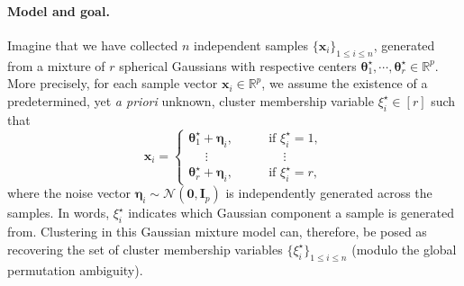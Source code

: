 \paragraph{Model and goal.}
Imagine that we have collected $n$ independent samples $\{\bm{x}_{i}\}_{1\leq i\leq n}$,
generated from a mixture of $r$ spherical Gaussians with respective centers $\bm{\theta}_{1}^{\star},\cdots,\bm{\theta}_{r}^{\star}\in\mathbb{R}^{p}$.
More precisely, for each sample vector $\bm{x}_{i}\in\mathbb{R}^{p}$, we assume the existence of a predetermined, yet {\em a priori} unknown,
cluster membership variable $\xi_{i}^{\star}\in [r]$ such that
%
\begin{equation}
\bm{x}_{i}=\begin{cases}
\bm{\theta}_{1}^{\star}+\bm{\eta}_{i},\qquad & \text{if }\xi_{i}^{\star}=1,\\
\quad\,\,\vdots & \quad\,\vdots\\
\bm{\theta}_{r}^{\star}+\bm{\eta}_{i}, & \text{if }\xi_{i}^{\star}=r,
\end{cases}\label{eq:data-model-r-Gaussian-GM}
\end{equation}
%
where the noise vector $\bm{\eta}_{i}\sim\mathcal{N}(\bm{0},\bm{I}_{p})$ is independently generated across the samples.
In words, $\xi_{i}^{\star}$ indicates which Gaussian component a sample is generated from.
Clustering in this Gaussian mixture model can, therefore,
be posed as recovering the set of cluster membership variables $\{\xi_{i}^{\star}\}_{1\leq i\leq n}$ (modulo the global permutation ambiguity).


